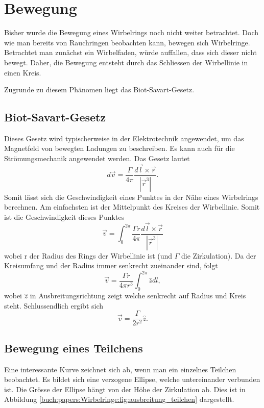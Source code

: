 \section{Bewegung}

Bisher wurde die Bewegung eines Wirbelrings noch nicht weiter betrachtet. 
Doch wie man bereits von Rauchringen beobachten kann, bewegen sich Wirbelringe. 
Betrachtet man zunächst ein Wirbelfaden, würde auffallen, dass sich dieser nicht bewegt. 
Daher, die Bewegung entsteht durch das Schliessen der Wirbellinie in einen Kreis. 

Zugrunde zu diesem Phänomen liegt das Biot-Savart-Gesetz\cite{Wirbelringe:FuehrerdurchdieStroemungslehre}. 

\subsection{Biot-Savart-Gesetz}

Dieses Gesetz wird typischerweise in der Elektrotechnik angewendet, um das Magnetfeld von bewegten Ladungen zu beschreiben. 
Es kann auch für die Strömungsmechanik angewendet werden. 
Das Gesetz lautet 
\[
d \vec{v}
=
\frac{\Gamma}{4\pi}\frac{d \vec{l} \times \vec{r}}{\left\lvert \vec{r}^3\right\rvert }.
\]
Somit lässt sich die Geschwindigkeit eines Punktes in der Nähe eines Wirbelrings berechnen. 
Am einfachsten ist der Mittelpunkt des Kreises der Wirbellinie. 
Somit ist die Geschwindigkeit dieses Punktes
\[
\vec{v}
=
\int_{0}^{2\pi} \frac{\Gamma r}{4\pi}\frac{d \vec{l} \times \vec{r}}{\left\lvert \vec{r}^3\right\rvert }
\]
wobei r der Radius des Rings der Wirbellinie ist (und \(\Gamma\) die Zirkulation). 
Da der Kreisumfang und der Radius immer senkrecht zueinander sind, folgt 
\[
\vec{v}
=
\frac{\Gamma r}{4\pi r^3} \int_{0}^{2\pi} \hat{z} dl,
\]
wobei \(\hat{z}\) in Ausbreitungsrichtung zeigt welche senkrecht auf Radius und Kreis steht. 
Schlussendlich ergibt sich
\[
\vec{v}
=
\frac{\Gamma }{2 r^2}\hat{z}.
\]

\subsection{Bewegung eines Teilchens}



Eine interessante Kurve zeichnet sich ab, wenn man ein einzelnes Teilchen beobachtet. 
Es bildet sich eine verzogene Ellipse, welche untereinander verbunden ist. 
Die Grösse der Ellipse hängt von der Höhe der Zirkulation ab. 
Dies ist in Abbildung \ref{buch:papers:Wirbelringe:fig:ausbreitung_teilchen} dargestellt.
